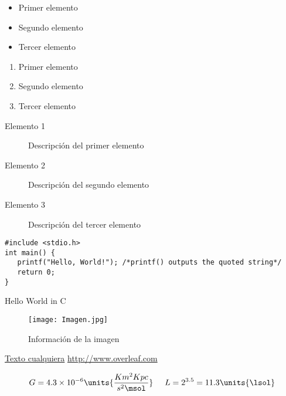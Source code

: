 \begin{itemize}
    \item Primer elemento
    \item Segundo elemento
    \item Tercer elemento
\end{itemize}

\begin{enumerate}
    \item Primer elemento
    \item Segundo elemento
    \item Tercer elemento
\end{enumerate}

\begin{description}
    \item[Elemento 1] Descripción del primer elemento
    \item[Elemento 2] Descripción del segundo elemento
    \item[Elemento 3] Descripción del tercer elemento
\end{description}


\begin{listing}[H]
\begin{verbatim}
#include <stdio.h>
int main() {
   printf("Hello, World!"); /*printf() outputs the quoted string*/
   return 0;
}
\end{verbatim}
\caption{Hello World in C}
\label{listing:2}
\end{listing}


\begin{figure}[H]
    \centering
    \texttt{[image: Imagen.jpg]}
    \caption{Información de la imagen}
    \label{fig:mesh1}
\end{figure}

\href{http://www.overleaf.com}{Texto  cualquiera}
\url{http://www.overleaf.com}

\begin{equation*}
    G = 4.3\times10^{-6}\units{\frac{Km^2Kpc}{s^2\msol}} \hspace{0.5cm} L = 2^{3.5} = 11.3 \units{\lsol}
\end{equation*}

